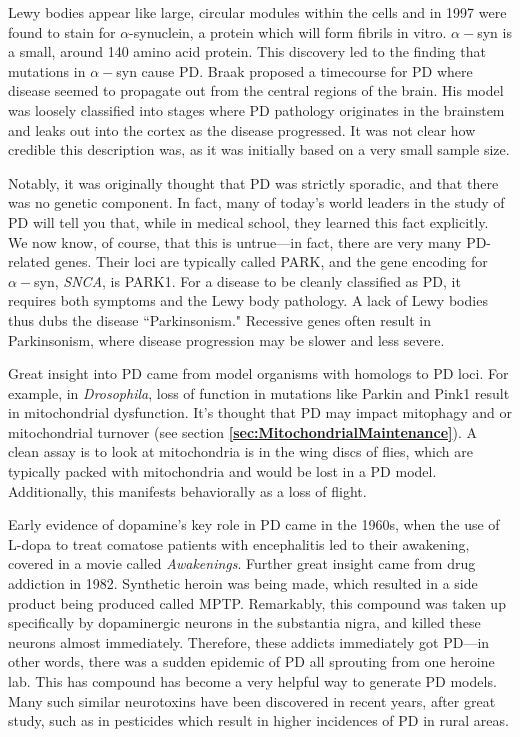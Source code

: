 Lewy bodies appear like large, circular modules within the cells and in 1997 were found to stain for $\alpha$-synuclein, a protein which will form fibrils in vitro. $\alpha-$syn is a small, around 140 amino acid protein. This discovery led to the finding that mutations in $\alpha-$syn cause PD. Braak proposed a timecourse for PD where disease seemed to propagate out from the central regions of the brain. His model was loosely classified into stages where PD pathology originates in the brainstem and leaks out into the cortex as the disease progressed. It was not clear how credible this description was, as it was initially based on a very small sample size.\newline

Notably, it was originally thought that PD was strictly sporadic, and that there was no genetic component. In fact, many of today's world leaders in the study of PD will tell you that, while in medical school, they learned this fact explicitly. We now know, of course, that this is untrue---in fact, there are very many PD-related genes. Their loci are typically called PARK, and the gene encoding for $\alpha-$syn, \textit{SNCA}, is PARK1. For a disease to be cleanly classified as PD, it requires both symptoms and the Lewy body pathology. A lack of Lewy bodies thus dubs the disease ``Parkinsonism." Recessive genes often result in Parkinsonism, where disease progression may be slower and less severe.\newline

Great insight into PD came from model organisms with homologs to PD loci. For example, in \textit{Drosophila}, loss of function in mutations like Parkin and Pink1 result in mitochondrial dysfunction. It's thought that PD may impact mitophagy and or mitochondrial turnover (see section \textbf{\ref{sec:MitochondrialMaintenance}}). A clean assay is to look at mitochondria is in the wing discs of flies, which are typically packed with mitochondria and would be lost in a PD model. Additionally, this manifests behaviorally as a loss of flight. \newline

Early evidence of dopamine's key role in PD came in the 1960s, when the use of L-dopa to treat comatose patients with encephalitis led to their awakening, covered in a movie called \textit{Awakenings}. Further great insight came from drug addiction in 1982. Synthetic heroin was being made, which resulted in a side product being produced called MPTP. Remarkably, this compound was taken up specifically by dopaminergic neurons in the substantia nigra, and killed these neurons almost immediately. Therefore, these addicts immediately got PD---in other words, there was a sudden epidemic of PD all sprouting from one heroine lab. This has compound has become a very helpful way to generate PD models. Many such similar neurotoxins have been discovered in recent years, after great study, such as in pesticides which result in higher incidences of PD in rural areas.

